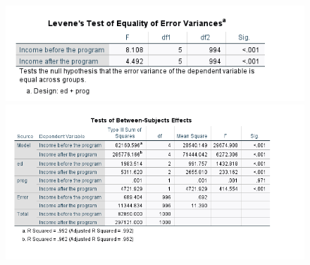 \documentclass[english,10pt,a4paper]{article}
\begin{document}
		\begin{figure}[h]
		
		
		\includegraphics[width=1.5\linewidth]{Levene's test}
		\includegraphics[width=1.5\linewidth]{Test between subject effect}
	\end{figure}
\end{document}
